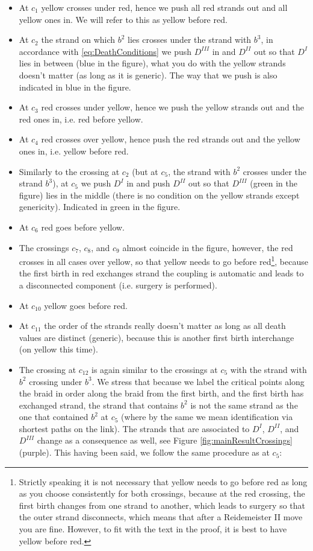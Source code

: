 \documentclass[twoside,leqno]{article}
\begin{document}
\begin{itemize} 
\item At $c_1$ yellow crosses under red, hence we push all red strands out and all yellow ones in. We will refer to this as yellow before red. 
\item At $c_2$ the strand on which $b^2$ lies crosses under the strand with $b^3$, in accordance with \eqref{eq:DeathConditions} we push $D^{III}$ in and $D^{II}$ out so that $D^{I}$ lies in between (blue in the figure), what you do with the yellow strands doesn't matter (as long as it is generic).  The way that we push is also indicated in blue in the figure.  
\item At $c_3$ red crosses under yellow, hence we push the yellow strands out and the red ones in, i.e. red before yellow.
\item At $c_4$ red crosses over yellow, hence push the red strands out and the yellow ones in, i.e. yellow before red. 
\item Similarly to the crossing at $c_2$ (but at $c_5$, the strand with $b^2$ crosses under the strand $b^3$), at $c_5$ we push $D^I$ in and push $D^{II}$ out so that $D^{III}$ (green in the figure) lies in the middle (there is no condition on the yellow strands except genericity). Indicated in green in the figure.  
\item At $c_6$ red goes before yellow.
\item  The crossings $c_7$, $c_8$, and $c_9$ almost coincide in the figure, however, the red crosses in all cases over yellow, so that yellow needs to go before red\footnote{Strictly speaking it is not necessary that yellow needs to go before red as long as you choose consistently for both crossings, because at the red crossing, the first birth changes from one strand to another, which leads to surgery so that the outer strand disconnects, which means that after a Reidemeister II move you are fine. However, to fit with the text in the proof, it is best to have yellow before red.}, because the first birth in red exchanges strand the coupling is automatic and leads to a disconnected component (i.e. surgery is performed).  
\item At $c_{10}$ yellow goes before red.
\item At $c_{11}$ the order of the strands really doesn't matter as long as all death values are distinct (generic), because this is another first birth interchange (on yellow this time). 
\item The crossing at $c_{12}$ is again similar to the crossings at $c_5$ with the strand with $b^2$ crossing under $b^3$. We stress that because we label the critical points along the braid in order along the braid from the first birth, and the first birth has exchanged strand, the strand that contains $b^2$ is not the same strand as the one that contained $b^2$ at $c_5$ (where by the same we mean identification via shortest paths on the link). The strands that are associated to $D^{I}$, $D^{II}$, and $D^{III}$ change as a consequence as well, see Figure \ref{fig:mainResultCrossings} (purple). This having been said, we follow the same procedure as at $c_{5}$:

\end{itemize}
\end{document}
